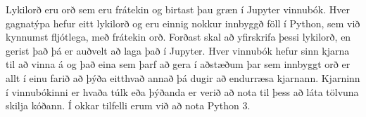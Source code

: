 Lykilorð eru orð sem eru frátekin og birtast þau græn í Jupyter vinnubók. 
Hver gagnatýpa hefur eitt lykilorð og eru einnig nokkur innbyggð föll í Python, sem við kynnumst fljótlega, með frátekin orð. 
Forðast skal að yfirskrifa þessi lykilorð, en gerist það þá er auðvelt að laga það í Jupyter. 
Hver vinnubók hefur sinn kjarna til að vinna á og það eina sem þarf að gera í aðstæðum þar sem innbyggt orð er allt í einu farið að þýða eitthvað annað þá dugir að endurræsa kjarnann.
Kjarninn í vinnubókinni er hvaða túlk eða þýðanda er verið að nota til þess að láta tölvuna skilja kóðann.
Í okkar tilfelli erum við að nota Python 3.